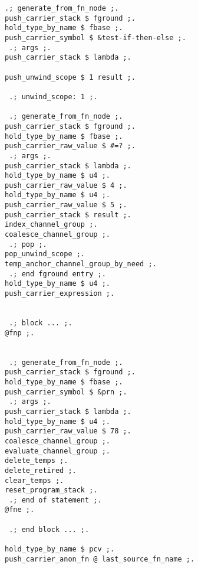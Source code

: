 \begin{figure} 
\begin{lstlisting}[caption={%
\emblink{\#lst--ifte--\thelstlisting.pgvm-pdf}{Channelized Intermediate Representation,    
  with deferred evaluation}},
  numbers = none, escapechar = !,label={lst:ifte-phr},
    basicstyle = \ttfamily\bfseries\footnotesize, linewidth = \linewidth]
 .; generate_from_fn_node ;.
push_carrier_stack $ fground ;.
hold_type_by_name $ fbase ;.
push_carrier_symbol $ &test-if-then-else ;.
 .; args ;.
push_carrier_stack $ lambda ;.

push_unwind_scope $ 1 result ;.

 .; unwind_scope: 1 ;.

 .; generate_from_fn_node ;.
push_carrier_stack $ fground ;.
hold_type_by_name $ fbase ;.
push_carrier_raw_value $ #=? ;.
 .; args ;.
push_carrier_stack $ lambda ;.
hold_type_by_name $ u4 ;.
push_carrier_raw_value $ 4 ;.
hold_type_by_name $ u4 ;.
push_carrier_raw_value $ 5 ;.
push_carrier_stack $ result ;.
index_channel_group ;.
coalesce_channel_group ;.
 .; pop ;.
pop_unwind_scope ;.
temp_anchor_channel_group_by_need ;.
 .; end fground entry ;.
hold_type_by_name $ u4 ;.
push_carrier_expression ;.


 .; block ... ;.
@fnp ;.


 .; generate_from_fn_node ;.
push_carrier_stack $ fground ;.
hold_type_by_name $ fbase ;.
push_carrier_symbol $ &prn ;.
 .; args ;.
push_carrier_stack $ lambda ;.
hold_type_by_name $ u4 ;.
push_carrier_raw_value $ 78 ;.
coalesce_channel_group ;.
evaluate_channel_group ;.
delete_temps ;.
delete_retired ;.
clear_temps ;.
reset_program_stack ;.
 .; end of statement ;.
@fne ;.

 .; end block ... ;.

hold_type_by_name $ pcv ;.
push_carrier_anon_fn @ last_source_fn_name ;.

\end{lstlisting}

\end{figure}

